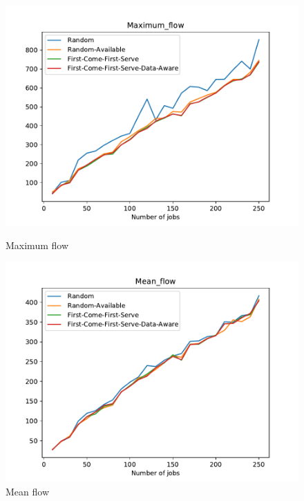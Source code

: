 \documentclass[a4paper]{article}
\begin{document}
\begin{figure}[ht] 
  \label{ fig7} 
  \begin{minipage}[b]{0.5\linewidth}
    \centering
    \includegraphics[width=1.11\linewidth]{MBSS/plot/Maximum_flow.pdf} 
    \caption{Maximum flow} 
    \vspace{4ex}
  \end{minipage}%
  \begin{minipage}[b]{0.5\linewidth}
    \centering
    \includegraphics[width=1.11\linewidth]{MBSS/plot/Mean_flow.pdf} 
    \caption{Mean flow} 
    \vspace{4ex}
  \end{minipage} 
  \begin{minipage}[b]{0.5\linewidth}

\end{minipage}
\end{figure}
\end{document}
